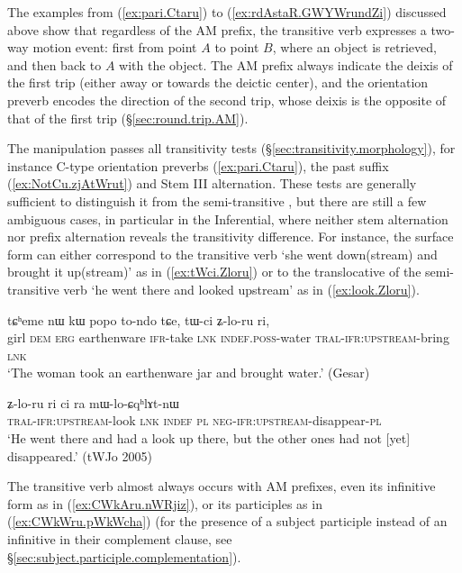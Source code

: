 The examples from (\ref{ex:pari.Ctaru}) to (\ref{ex:rdAstaR.GWYWrundZi}) discussed above show that regardless of the AM prefix, the transitive verb  expresses a two-way motion event: first from point $A$ to point $B$, where an object is retrieved, and then back to $A$ with the object.  The AM prefix always indicate the deixis of the first trip (either away or towards the deictic center), and the orientation preverb encodes the direction of the second trip, whose deixis is the opposite of that of the first trip (§\ref{sec:round.trip.AM}).

The manipulation  passes all transitivity tests (§\ref{sec:transitivity.morphology}), for instance C-type orientation preverbs (\ref{ex:pari.Ctaru}), the past suffix  (\ref{ex:NotCu.zjAtWrut}) and Stem III alternation. These tests are generally sufficient to distinguish it from the semi-transitive , but there are still a few ambiguous cases, in particular in the Inferential, where neither stem alternation nor prefix alternation reveals the transitivity difference. For instance, the surface form  can either correspond to the transitive verb `she went down(stream) and brought it up(stream)' as in (\ref{ex:tWci.Zloru}) or to the translocative of the semi-transitive verb `he went there and looked upstream' as in (\ref{ex:look.Zloru}).

\begin{exe}
\ex \label{ex:tWci.Zloru}
\gll tɕʰeme nɯ kɯ popo to-ndo tɕe, tɯ-ci ʑ-lo-ru ri, \\
girl \textsc{dem} \textsc{erg} earthenware \textsc{ifr}-take \textsc{lnk} \textsc{indef}.\textsc{poss}-water \textsc{tral}-\textsc{ifr}:\textsc{upstream}-bring \textsc{lnk} \\
\glt `The woman took an earthenware jar and brought water.' (Gesar)
\end{exe}

\begin{exe}
\ex \label{ex:look.Zloru}
\gll  ʑ-lo-ru ri ci ra mɯ-lo-ɕqʰlɤt-nɯ\\
\textsc{tral}-\textsc{ifr}:\textsc{upstream}-look \textsc{lnk} \textsc{indef} \textsc{pl} \textsc{neg}-\textsc{ifr}:\textsc{upstream}-disappear-\textsc{pl}\\
\glt `He went there and had a look up there, but the other ones had not [yet] disappeared.' (tWJo 2005) 
\end{exe}

The transitive verb  almost always occurs with AM prefixes, even its infinitive form  as in (\ref{ex:CWkAru.nWRjiz}), or its participles as in (\ref{ex:CWkWru.pWkWcha}) (for the presence of a subject participle instead of an infinitive in their complement clause, see §\ref{sec:subject.participle.complementation}).

